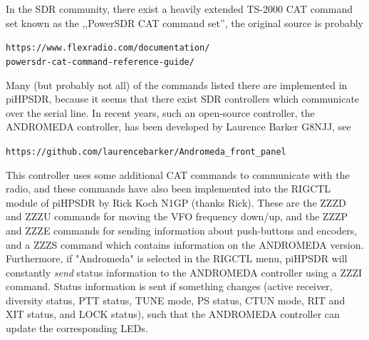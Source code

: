 \documentclass[12pt]{book}
\begin{document}
In the SDR community, there exist a heavily extended TS-2000 CAT command set known as the ,,PowerSDR CAT command set'', the original
source is probably

\texttt{https://www.flexradio.com/documentation/}\\
\texttt{powersdr-cat-command-reference-guide/}

Many (but probably not all) of the commands listed there are implemented in piHPSDR, because it seems that there exist SDR controllers
which communicate over the serial line. In recent years, such an open-source controller, the ANDROMEDA controller, has been
developed by Laurence Barker G8NJJ, see

\texttt{https://github.com/laurencebarker/Andromeda\_front\_panel}

This controller uses some additional CAT commands to communicate with the radio, and these commands have also been implemented into 
the RIGCTL module of piHPSDR by Rick Koch N1GP (thanks Rick). These are the ZZZD and ZZZU commands for moving the VFO frequency
down/up, and the ZZZP and ZZZE commands for sending information about push-buttons and encoders, and a ZZZS command which
contains information on the ANDROMEDA version. Furthermore, if "Andromeda" is selected in the RIGCTL menu, piHPSDR will constantly
\textit{send} status information to the ANDROMEDA controller using a ZZZI command. Status information is sent if something
changes (active receiver,  diversity status, PTT status, TUNE mode, PS status, CTUN mode, RIT and XIT status, and LOCK status),
such that the ANDROMEDA controller can update the corresponding LEDs.
\end{document}
